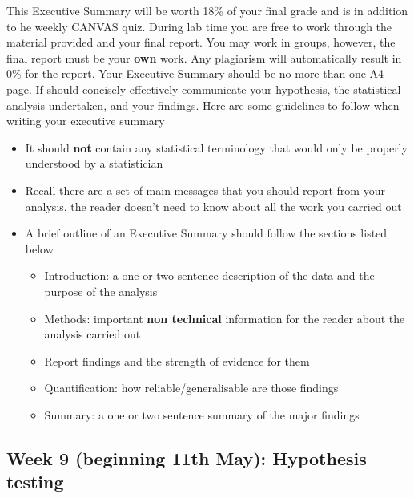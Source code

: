 \documentclass{article}
\begin{document}
This Executive Summary will be worth  18\% of your final grade and is in addition to he weekly CANVAS quiz. During lab time you are free to work through the material provided and your final report. You may work in groups, however, the final report must be your \textbf{own} work. Any plagiarism will automatically result in 0\% for the report. Your Executive Summary should be no more than one A4 page. If should concisely effectively communicate your hypothesis, the statistical analysis undertaken, and your findings. Here are some guidelines to follow when writing your executive summary
\begin{itemize}
\item  It should \textbf{not} contain any statistical terminology that would only be properly understood by a statistician
  \item Recall there are a set of main messages that you should report from your analysis, the reader doesn't need to know about all the work you carried out
\item A brief outline of an Executive Summary should follow the sections listed below
  \begin{itemize}
\item Introduction: a one or two sentence description of the data and the purpose of the analysis
\item Methods: important \textbf{non technical} information for the reader about the analysis carried out
\item Report findings and the strength of evidence for them
\item Quantification: how reliable/generalisable are those findings
  \item Summary: a one or two sentence summary of the major findings
  \end{itemize}
\end{itemize}

\newpage

\subsection*{Week 9 (beginning 11th May): Hypothesis testing}
\end{document}
